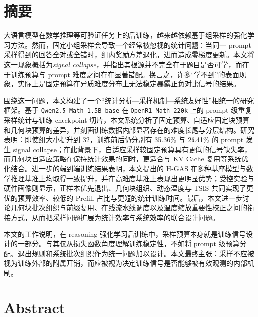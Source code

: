 \maketitle%
{\hfuzz=10pt\MAKETITLE}%
\makedeclaration%
\intobmk\chapter*{摘要}%
\setcounter{page}{1}%

大语言模型在数学推理等可验证任务上的后训练，越来越依赖基于组采样的强化学习方法。然而，固定小组采样会导致一个经常被忽视的统计问题：当同一 prompt 采样得到的回答全对或全错时，组内奖励方差退化，进而造成零梯度更新。本文将这一现象概括为\textit{signal collapse}，并指出其根源并不完全在于题目是否可学，而在于训练预算与 prompt 难度之间存在显著错配。换言之，许多“学不到”的表面现象，实际上是固定预算在异质难度分布上无法稳定暴露正负对比信号的结果。

围绕这一问题，本文构建了一个“统计分析—采样机制—系统友好性”相统一的研究框架。基于 \texttt{Qwen2.5-Math-1.5B base} 在 \texttt{OpenR1-Math-220k} 上的 prompt 级重复采样统计与训练 checkpoint 切片，本文系统分析了固定预算、自适应固定块预算和几何块预算的差异，并刻画训练数据内部显著存在的难度长尾与分层结构。研究表明：即使组大小提升到 $32$，训练前后仍分别有 35.36\% 与 26.41\% 的 prompt 发生 signal collapse；在此背景下，自适应采样较固定预算具有更低的信号缺失率，而几何块自适应策略在保持统计效果的同时，更适合与 KV Cache 复用等系统优化结合。进一步的端到端训练结果表明，本文提出的 H-GAS 在多种基座模型与数学推理基准上均取得一致提升，并在高难度基准上表现出更明显优势；受控实验与硬件画像则显示，正样本优先退出、几何块组织、动态温度与 TSIS 共同实现了更优的预算效率、较低的 Prefill 占比与更短的统计训练时间。最后，本文进一步讨论几何块批次组织与前缀复用、在线流水线调度以及温度缩放重要性校正之间的衔接方式，从而把采样问题扩展为统计效率与系统效率的联合设计问题。

本文的工作说明，在 reasoning 强化学习后训练中，采样预算本身就是训练信号设计的一部分。与其仅从损失函数角度理解训练稳定性，不如将 prompt 级预算分配、退出规则和系统批次组织作为统一问题加以设计。本文最终主张：采样不应被视为训练外部的附属开销，而应被视为决定训练信号是否能够被有效观测的内部机制。

\intobmk\chapter*{Abstract}%

